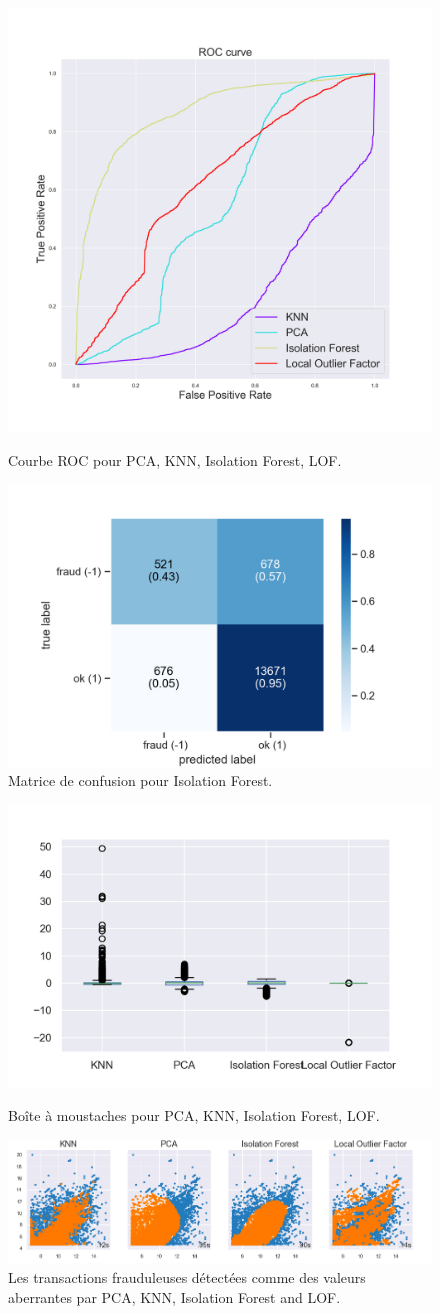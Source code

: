 \begin{figure}[H]
    \includegraphics[width=.4\textwidth]{ADOA/Images/sales_roc.png}
     \caption{Courbe ROC pour PCA, KNN, Isolation Forest, LOF.}%
     \label{fig_sal14}
    \includegraphics[width=.5\textwidth]{ADOA/Images/sales_confusionmat.png}
  \caption{Matrice de confusion pour Isolation Forest.}
    \label{fig_sal13}
\end{figure}

\begin{figure}[H]
    \includegraphics[width=.45\textwidth]{ADOA/Images/sales_boxplot.png}
    \label{fig_sal12}
    \caption{Boîte à moustaches pour PCA, KNN, Isolation Forest, LOF.}%
\end{figure}

\begin{figure}[ht!]
    \centering
    \includegraphics[width=1.06\textwidth]{ADOA/Images/sale_algo.png}
    \caption{Les transactions frauduleuses détectées comme des valeurs aberrantes par PCA, KNN, Isolation Forest and LOF.}%
    \label{fig_sal2}
\end{figure}


\afterpage{\FloatBarrier}
